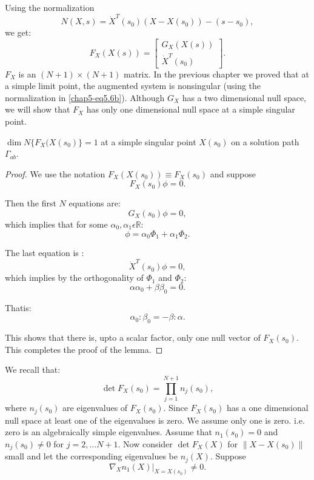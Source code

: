 Using the normalization
\begin{equation*}
N(X,s) = \dot{X}^T (s_0)(X-X(s_0))-(s-s_0), \tag{5.6b}\label{chap5-eq5.6b}   
\end{equation*}
we get: 
\begin{equation*}
F_X(X(s))=
\begin{bmatrix}
G_X (X(s))\\
\dot{X}^T(s_0) 
\end{bmatrix}.\tag{5.6c}\label{chap5-eq5.6c}  
\end{equation*}\pageoriginale
$F_X$ is an $(N+1) \times (N+1)$ matrix. In the previous chapter we
proved that at a simple limit point, the augmented system is
nonsingular (using the normalization in \eqref{chap5-eq5.6b}). 
Although $G_X$ has a two dimensional null space, we will show that
$F_X$ has only one dimensional null space at a simple singular point. 

\setcounter{chaplemma}{6}
\begin{chaplemma}\label{chap5-lem5.7}
$\dim N\{ F_X(X(s_0)\}=1$ at a simple singular point $X(s_0)$ on
    a solution path $ \Gamma_{ab}$. 
\end{chaplemma}

\begin{proof}
We use the notation $F_X(X(s_0)) \equiv F_X(s_0)$ and suppose
$$
F_X(s_0)\phi=0.
$$

Then the first $N$ equations are:
$$
G_X(s_0)\phi=0,
$$
which implies that for some $\alpha_0,\alpha_1  \epsilon\mathbb{R}$: 
$$
\phi =\alpha_0 \Phi_1 +\alpha_1 \Phi_2.
$$

The last equation is :
$$
\dot{X}^{T}(s_0) \phi =0, 
$$
which implies by the orthogonality of $\Phi_1$ and  $\Phi_2$: 
$$
\alpha \alpha_0 + \beta \beta_0 =0.
$$

That\pageoriginale is:
$$
\alpha_0 : \beta_0 = - \beta : \alpha.
$$

This shows that there is, upto a scalar factor, only one null vector
of $F_X(s_0)$. This completes the proof of the lemma.
\end{proof}

We recall that:
$$
\det F_X(s_0)= \prod^{N+1}_{j=1} n_j(s_0), 
$$
where $n_j(s_0)$ are eigenvalues of $F_X(s_0)$. Since $F_X(s_0)$ has a
one dimensional null space at least one of the eigenvalues is zero. We
assume only one is zero. i.e. zero is an algebraically simple
eigenvalues. 
Assume that $n_1(s_0)=0$ and $n_j(s_0) \neq 0$ for $j=2, \ldots
N+1$. Now consider $\det F_X(X)$ for $\parallel X-X(s_0)\parallel$
small and let the corresponding eigenvalues be $n_j(X)$. Suppose 
$$
\nabla_X n_1(X)|_{X=X(s_0)}\neq 0.
$$

